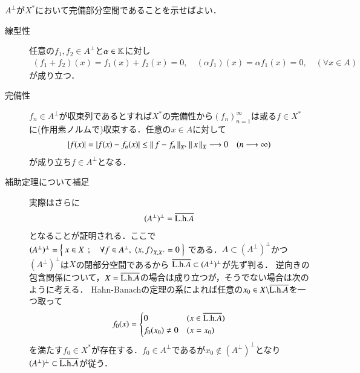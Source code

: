 	\begin{prf}
		$A^{\perp}$が$X^*$において完備部分空間であることを示せばよい．
		\begin{description}
			\item[線型性]
				任意の$f_1,f_2 \in A^{\perp}$と$\alpha \in \mathbb{K}$に対し
				\begin{align}
					(f_1 + f_2)(x) = f_1(x) + f_2(x) = 0, \quad (\alpha f_1)(x) = \alpha f_1(x) = 0
					,\quad (\forall x \in A)
				\end{align}
				が成り立つ．
				
			\item[完備性]
				$f_n \in A^{\perp}$が収束列であるとすれば$X^*$の完備性から$(f_n)_{n=1}^{\infty}$は或る$f \in X^*$
				に(作用素ノルムで)収束する．任意の$x \in A$に対して
				\begin{align}
					|f(x)| = |f(x) - f_n(x)| \leq \left\|\, f-f_n\, \right\|_{X^*}\left\|\, x\, \right\|_{X} \longrightarrow 0 \quad (n \longrightarrow \infty)
				\end{align}
				が成り立ち$f \in A^{\perp}$となる．
		\end{description}
		
		\QED
	\end{prf}
	
	\begin{description}
		\item[補助定理について補足]
			実際はさらに
			\begin{align}
				(A^{\perp})^{\perp} = \overline{\mathrm{L.h.} A}
			\end{align}
			となることが証明される．ここで$(A^{\perp})^{\perp} = \Set{x \in X}{\forall f \in A^{\perp},\ \inprod<x,f>_{X,X^*} = 0}$
			である．$A \subset (A^{\perp})^{\perp}$かつ$(A^{\perp})^{\perp}$は$X$の閉部分空間であるから
			$\overline{\mathrm{L.h.} A} \subset (A^{\perp})^{\perp}$が先ず判る．
			逆向きの包含関係について，$X = \overline{\mathrm{L.h.} A}$の場合は成り立つが，そうでない場合は次のように考える．
			Hahn-Banachの定理の系によれば任意の$x_0 \in X \backslash \overline{\mathrm{L.h.} A}$を一つ取って
			\begin{align}
				f_0(x) = 
				\begin{cases}
					0 & (x \in \overline{\mathrm{L.h.} A}) \\
					f_0(x_0) \neq 0 & (x = x_0)
				\end{cases}
			\end{align}
			を満たす$f_0 \in X^*$が存在する．$f_0 \in A^{\perp}$であるが$x_0 \notin (A^{\perp})^{\perp}$となり
			$(A^{\perp})^{\perp} \subset \overline{\mathrm{L.h.} A}$が従う．
			\QED
	\end{description}
	

